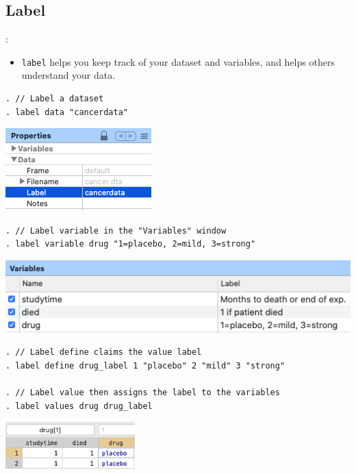 \subsection{Label}
\begin{frame}{\secname : \subsecname}
\begin{itemize}
	\item 	\verb|label| helps you keep track of your dataset and variables, and helps others understand your data. 
\end{itemize}

\footnotesize
\begin{verbatim}
. // Label a dataset
. label data "cancerdata" 
\end{verbatim}
\begin{center}
	\includegraphics[scale=0.5]{image/label_data}
\end{center}

\begin{verbatim}
. // Label variable in the "Variables" window
. label variable drug "1=placebo, 2=mild, 3=strong"
\end{verbatim}

\begin{center}
	\includegraphics[scale=0.4]{image/label_var}
\end{center}

\framebreak

\begin{verbatim}
. // Label define claims the value label
. label define drug_label 1 "placebo" 2 "mild" 3 "strong"

. // Label value then assigns the label to the variables
. label values drug drug_label
\end{verbatim}

\begin{center}
	\includegraphics[width=50mm,scale=0.5]{image/label_def}
\end{center}

\end{frame}

